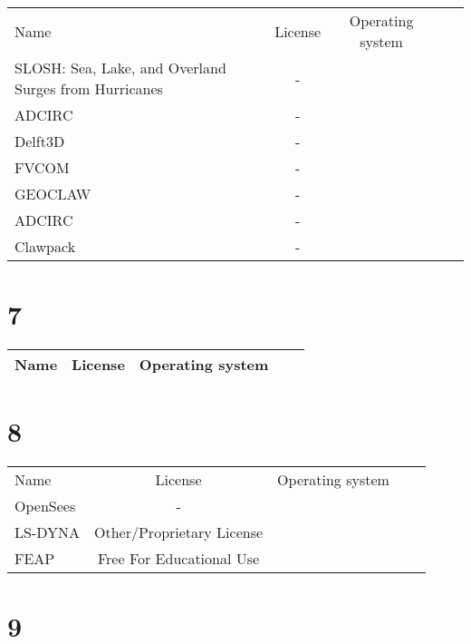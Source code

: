 \begin{table}[]
    \centering
    \begin{tabular}{l|cccc}
    \toprule
    Name &  License & Operating system\\
        SLOSH: Sea, Lake, and Overland Surges from Hurricanes & - &\\
        ADCIRC & - &\\
        Delft3D & - &\\
        FVCOM & - &\\
        GEOCLAW & - &\\
        ADCIRC & - &\\
        Clawpack & - &\\

    \bottomrule
    \end{tabular}
    \end{table}

\section{7}

\begin{table}[]
    \centering
    \begin{tabular}{l|cccc}
    \toprule
    Name &  License & Operating system\\

    \bottomrule
    \end{tabular}
    \end{table}

\section{8}

\begin{table}[]
    \centering
    \begin{tabular}{l|cccc}
    \toprule
    Name &  License & Operating system\\
        OpenSees & - &\\
        LS-DYNA &  Other/Proprietary License &\\
        FEAP &  Free For Educational Use &\\

    \bottomrule
    \end{tabular}
    \end{table}

\section{9}

